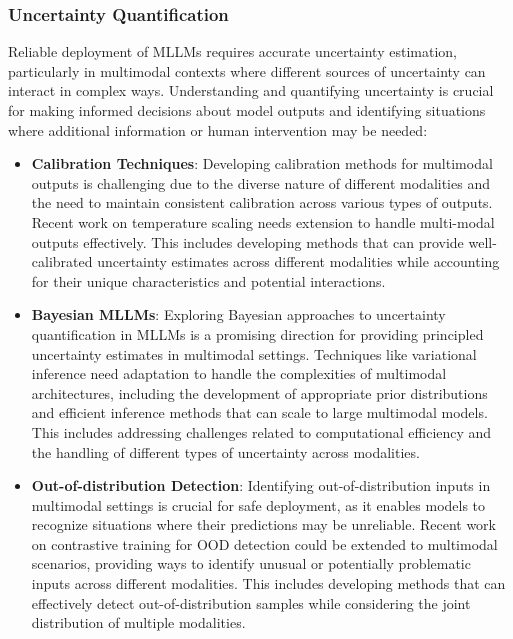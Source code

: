 \subsubsection{Uncertainty Quantification}
Reliable deployment of MLLMs requires accurate uncertainty estimation, particularly in multimodal contexts where different sources of uncertainty can interact in complex ways. Understanding and quantifying uncertainty is crucial for making informed decisions about model outputs and identifying situations where additional information or human intervention may be needed:

\begin{itemize}
    \item \textbf{Calibration Techniques}: Developing calibration methods for multimodal outputs is challenging due to the diverse nature of different modalities and the need to maintain consistent calibration across various types of outputs. Recent work on temperature scaling \citep{guo2017calibration} needs extension to handle multi-modal outputs effectively. This includes developing methods that can provide well-calibrated uncertainty estimates across different modalities while accounting for their unique characteristics and potential interactions.
    
    \item \textbf{Bayesian MLLMs}: Exploring Bayesian approaches to uncertainty quantification in MLLMs is a promising direction for providing principled uncertainty estimates in multimodal settings. Techniques like variational inference \citep{blei2017variational} need adaptation to handle the complexities of multimodal architectures, including the development of appropriate prior distributions and efficient inference methods that can scale to large multimodal models. This includes addressing challenges related to computational efficiency and the handling of different types of uncertainty across modalities.
    
    \item \textbf{Out-of-distribution Detection}: Identifying out-of-distribution inputs in multimodal settings is crucial for safe deployment, as it enables models to recognize situations where their predictions may be unreliable. Recent work on contrastive training for OOD detection \citep{tack2020csi} could be extended to multimodal scenarios, providing ways to identify unusual or potentially problematic inputs across different modalities. This includes developing methods that can effectively detect out-of-distribution samples while considering the joint distribution of multiple modalities.
\end{itemize}

